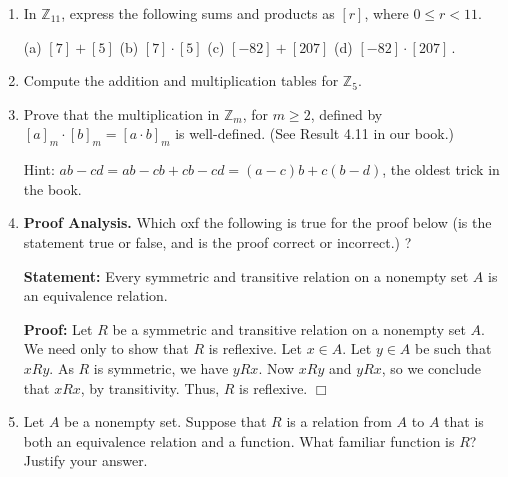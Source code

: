\documentclass[12pt]{article}
\newcommand{\ZZ}{{\mathbb Z}}  %
\begin{document}
\begin{enumerate}
\item In $\ZZ_{11}$, express the following sums and products as $[r]$, where $0\leq r < 11$.
  
  (a) $[7] + [5]$ \quad
  (b) $[7]\cdot [5]$ \quad
  (c) $[-82] + [207]$ \quad
  (d) $[-82] \cdot [207]$\,.
  
\item Compute the addition and multiplication tables for $\ZZ_5$.
  

\item Prove that the multiplication in $\ZZ_m$, for $m\geq 2$, defined by $[a]_m\cdot[b]_m=[a\cdot b]_m$ is well-defined.
  (See Result 4.11 in our book.)

  Hint: $ ab-cd = ab-cb + cb-cd = (a-c)b + c(b-d)$, the oldest trick in the book.

       
\item {\bf Proof Analysis.}   Which oxf the following is true for the proof below (is the statement true or false, and is
  the proof correct or incorrect.) ?

  {\bf Statement:} Every symmetric and transitive relation on a nonempty set $A$ is an equivalence relation.

  {\bf Proof:} Let $R$ be a symmetric and transitive relation on a nonempty set $A$.
  We need only to show that $R$ is reflexive.
  Let $x\in A$.
  Let $y\in A$ be such that $xRy$.
  As $R$ is symmetric, we have $yRx$.
  Now $xRy$ and $yRx$, so we conclude that $xRx$, by transitivity.
  Thus, $R$ is reflexive. \hfill $\Box$

  

\item  Let $A$ be a nonempty set.
  Suppose that $R$ is a relation from $A$ to $A$ that is both an equivalence relation and a function.
  What familiar function is $R$?
  Justify your answer.  


\end{enumerate}
\end{document}
